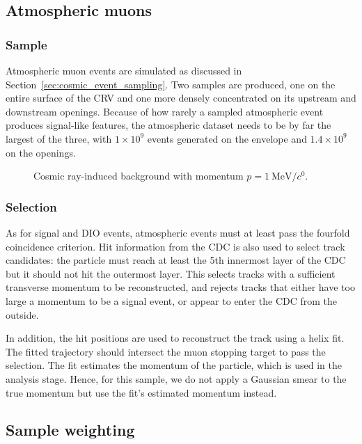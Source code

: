 \subsection{Atmospheric muons}

\subsubsection{Sample}

Atmospheric muon events are simulated as discussed in
Section~\ref{sec:cosmic_event_sampling}. Two samples are produced, one on the
entire surface of the CRV and one more densely concentrated on its upstream and
downstream openings. Because of how rarely a sampled atmospheric event produces
signal-like features, the atmospheric dataset needs to be by far the largest of
the three, with $1 \times 10^9$ events generated on the envelope and $1.4 \times
10^9$ on the openings.



\begin{figure}
    \centering
    
    \caption{Cosmic ray-induced background with momentum $p=\SI{1}{\MeV/\clight}$.}
    \label{fig:cosmic_bg_in_cydet}
\end{figure}

\subsubsection{Selection}
As for signal and DIO events, atmospheric events must at least pass the fourfold
coincidence criterion. Hit information from the CDC is also used to select
track candidates: the particle must reach at least the 5th innermost layer of
the CDC but it should not hit the outermost layer. This selects tracks with a
sufficient transverse momentum to be reconstructed, and rejects tracks that
either have too large a momentum to be a signal event, or appear to enter the
CDC from the outside. 

In addition, the hit positions are used to reconstruct the track using a helix
fit. The fitted trajectory should intersect the muon stopping target to pass the
selection. The fit estimates the momentum of the particle, which is used in the
analysis stage. Hence, for this sample, we do not apply a Gaussian smear to the
true momentum but use the fit's estimated momentum instead.


\subsection{Sample weighting}

